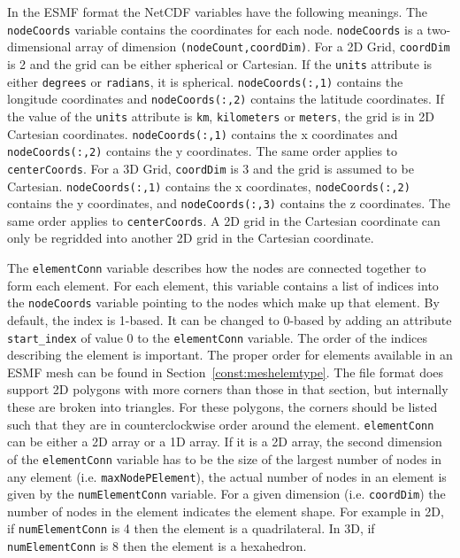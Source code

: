  In the ESMF format the NetCDF variables have the following meanings. The {\tt nodeCoords} variable contains the coordinates for each node.
 {\tt nodeCoords} is a two-dimensional array of dimension {\tt (nodeCount,coordDim)}.
 For a 2D Grid, {\tt coordDim} is 2 and the grid can be either spherical or Cartesian. If the {\tt units}
 attribute is either {\tt degrees} or {\tt radians}, it is spherical. {\tt nodeCoords(:,1)} contains 
the longitude coordinates and {\tt nodeCoords(:,2)} contains the latitude coordinates.  If the value of 
the {\tt units} attribute is {\tt km}, {\tt kilometers} or {\tt meters}, the grid is in 2D Cartesian 
coordinates. {\tt nodeCoords(:,1)} contains the x coordinates and
 {\tt nodeCoords(:,2)} contains the y coordinates.
 The same order applies to {\tt centerCoords}.
 For a 3D Grid, {\tt coordDim} is 3 and the grid is assumed to be Cartesian. {\tt nodeCoords(:,1)} contains the x coordinates, {\tt nodeCoords(:,2)} contains the y coordinates, 
 and {\tt nodeCoords(:,3)} contains the z coordinates.  The same order applies to {\tt centerCoords}.
A 2D grid in the Cartesian coordinate can only be regridded into another 2D grid in the Cartesian coordinate.
 
 The {\tt elementConn} variable describes how the nodes are connected together to form each element. For each element, this variable contains a list of indices into the {\tt nodeCoords} variable pointing to the nodes which make up that
 element. By default, the index is 1-based.  It can be changed to 0-based by adding an attribute 
{\tt start\_index} of value 0 to the {\tt elementConn} variable.  The order of the indices describing the element is important.
 The proper order for elements available in an ESMF mesh can be found in Section~\ref{const:meshelemtype}. The file format does support 2D polygons with more
 corners than those in that section, but internally these are broken into triangles. For these polygons, the corners should
 be listed such that they are in counterclockwise order around the element.
{\tt elementConn} can be either a 2D array or a 1D array.  If it is a 2D array, the second
 dimension of the {\tt elementConn} variable has to be the size of the largest number of nodes in any element (i.e. {\tt maxNodePElement}), the actual number of
 nodes in an element is given by the {\tt numElementConn} variable. For a given dimension (i.e. {\tt coordDim}) the number of nodes in the element
 indicates the element shape. For example in 2D, if {\tt numElementConn} is 4 then the element is a quadrilateral. In 3D, if {\tt numElementConn} is 8
 then the element is a hexahedron.

